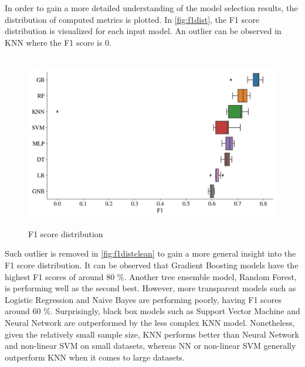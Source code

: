         \clearpage
        \newpage
        \restoregeometry
        \fancyheadoffset{0pt}
        
        In order to gain a more detailed understanding of the model selection results, the distribution of computed metrics is plotted. In \autoref{fig:f1dist}, the F1 score distribution is visualized for each input model. An outlier can be observed in KNN where the F1 score is 0.				
        \begin{figure}[H]
            \centering
            \caption{F1 score distribution}\vspace{0.5em}
            \label{fig:f1dist}\
            \includegraphics[width=140mm]{Figures/F1_Distribution.jpg}
            \vspace{-1em}
        \end{figure}
        Such outlier is removed in \autoref{fig:f1distclean} to gain a more general insight into the F1 score distribution.
        It can be observed that Gradient Boosting models have the highest F1 scores of around 80 \%.
        Another tree ensemble model, Random Forest, is performing well as the second best. However, more transparent models such as Logistic Regression and Naive Bayes are performing poorly, having F1 scores around 60 \%.
        Surprisingly, black box models such as Support Vector Machine and Neural Network are outperformed by the less complex KNN model.
        Nonetheless, given the relatively small sample size, KNN performs better than Neural Network and non-linear SVM on small datasets, whereas NN or non-linear SVM generally outperform KNN when it comes to large datasets.
